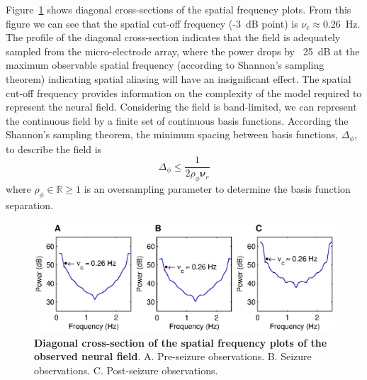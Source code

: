 \documentclass[]{article}
\begin{document}
Figure~\ref{fig:DiagSpatialFreqObservation} shows diagonal cross-sections of the spatial frequency plots. From this figure we can see that the spatial cut-off frequency (-3~dB point) is $\nu_c \approx 0.26$~Hz. The profile of the diagonal cross-section indicates that the field is adequately sampled from the micro-electrode array, where the power drops by ~25~dB at the maximum observable spatial frequency (according to Shannon's sampling theorem) indicating spatial aliasing will have an insignificant effect. The spatial cut-off frequency provides information on the complexity of the model required to represent the neural field. Considering the field is band-limited, we can represent the continuous field by a finite set of continuous basis functions. According the Shannon's sampling theorem, the minimum spacing between basis functions, $\Delta_{\phi}$, to describe the field is
\begin{equation}\label{eq:BasisFunctionSeparation}
	\Delta_{\phi} \leq \frac{1}{2\rho_{\phi}\boldsymbol{\nu}_{c}}
\end{equation}
where $\rho_{\phi} \in \mathbb{R} \ge 1$ is an oversampling parameter to determine the basis function separation.



\begin{figure}[!ht]
\begin{center}
\includegraphics{./Figures/SpatialFreqCrossSection.eps}
\end{center}
\caption{{\bf Diagonal cross-section of the spatial frequency plots of the observed neural field}. A. Pre-seizure observations. B. Seizure observations. C. Post-seizure observations.}
\label{fig:DiagSpatialFreqObservation}
\end{figure}
\end{document}
